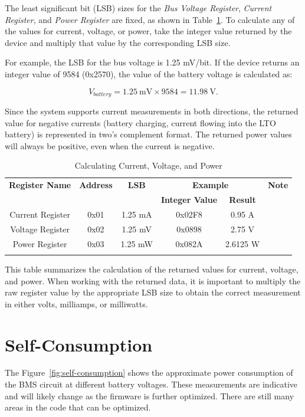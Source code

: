 \documentclass[11pt]{datasheet}
\begin{document}
The least significant bit (LSB) sizes for the \textit{Bus Voltage Register},
\textit{Current Register}, and \textit{Power Register} are fixed, as shown in
Table~\ref{tab:register_calculations}. To calculate any of the values
for current, voltage, or power, take the integer value returned by
the device and multiply that value by the corresponding LSB size.

For example, the LSB for the bus voltage is 1.25 mV/bit. If the device
returns an integer value of 9584 (0x2570), the value of the battery voltage
is calculated as:

\[
V_{battery} = 1.25\ \text{mV} \times 9584 = 11.98\ \text{V}.
\]

Since the system supports current measurements in both directions,
the returned value for negative currents (battery charging, current
flowing into the LTO battery) is represented in two's complement
format. The returned power values will always be positive, even
when the current is negative.

\begin{table}[ht]
\centering
\caption{Calculating Current, Voltage, and Power}
\begin{tabularx}{\textwidth}{c|c|c|c|c|c}
\thickhline
\textbf{Register Name} & \textbf{Address} & \textbf{LSB} & \multicolumn{2}{c|}{\textbf{Example}} & \textbf{Note} \\
\cline{4-5}
& & & \textbf{Integer Value} & \textbf{Result} & \\ 
\thickhline
Current Register & 0x01 & 1.25 mA & 0x02F8 & 0.95 A & \\
Voltage Register & 0x02 & 1.25 mV & 0x0898 & 2.75 V & \\
Power Register & 0x03 & 1.25 mW & 0x082A & 2.6125 W & \\
\thickhline
\end{tabularx}
\label{tab:register_calculations}
\end{table}

This table summarizes the calculation of the returned values for
current, voltage, and power. When working with the returned data,
it is important to multiply the raw register value by the
appropriate LSB size to obtain the correct measurement in either
volts, milliamps, or milliwatts.

\section{Self-Consumption}

The Figure~\ref{fig:self-consumption} shows the approximate power consumption of
the BMS circuit at different battery voltages. These measurements
are indicative and will likely change as the firmware is further
optimized. There are still many areas in the code that can be optimized.
\end{document}
